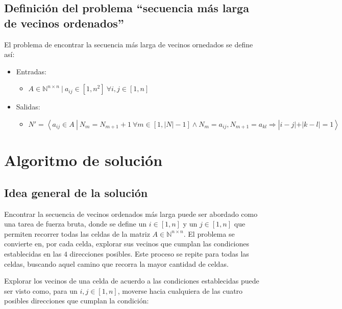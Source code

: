 \documentclass[letter]{article}
\begin{document}
\subsection{Definición del problema ``secuencia más larga de vecinos ordenados''} \label{formalizacion:definicion}

El problema de encontrar la secuencia más larga de vecinos ornedados se define así: \par

\begin{itemize}
    \item Entradas:
    \begin{itemize}[leftmargin=1em]
        \item $A \in {\mathbb{N}}^{n \times n} ~ | ~ a_{ij} \in [1, n^2] ~ \forall i, j \in [1, n]$
    \end{itemize}
    \item Salidas:
    \begin{itemize}[leftmargin=1em]
        \item $N' = \left< a_{ij} \in A ~ | ~ N_m = N_{m+1} + 1 ~ \forall m \in [1, |N| - 1] \land N_m = a_{ij}, N_{m+1} = a_{kl} \Rightarrow | i - j | + | k - l | = 1 \right>$
    \end{itemize}
\end{itemize}

\section{Algoritmo de solución} \label{algoritmo}

\subsection{Idea general de la solución} \label{algoritmo:idea}

Encontrar la secuencia de vecinos ordenados más larga puede ser abordado como una tarea de fuerza bruta, donde se define un $i \in [1, n]$ y un $j \in [1, n]$ que permiten recorrer todas las celdas de la matriz $A \in \mathbb{N}^{n \times n}$. El problema se convierte en, por cada celda, explorar sus vecinos que cumplan las condiciones establecidas en las $4$ direcciones posibles. Este proceso se repite para todas las celdas, buscando aquel camino que recorra la mayor cantidad de celdas. \par

Explorar los vecinos de una celda de acuerdo a las condiciones establecidas puede ser visto como, para un $i, j \in [1, n]$, moverse hacia cualquiera de las cuatro posibles direcciones que cumplan la condición: \par
\end{document}

